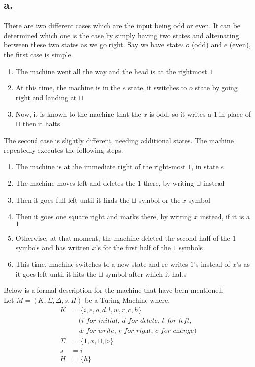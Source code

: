 \documentclass[12pt]{article}
\begin{document}
\subsection*{a.}
There are two different cases which are the input being odd or even. It can be determined which one is the case by simply having two states and alternating between these two states as we go right. Say we have states $o$ (odd) and $e$ (even), the first case is simple.
\begin{enumerate}
    \item The machine went all the way and the head is at the rightmost $1$
    \item At this time, the machine is in the $e$ state, it switches to $o$ state by going right and landing at $\sqcup$
    \item Now, it is known to the machine that the $x$ is odd, so it writes a $1$ in place of $\sqcup$ then it halts
\end{enumerate}
The second case is slightly different, needing additional states. The machine repeatedly executes the following steps.
\begin{enumerate}
    \item The machine is at the immediate right of the right-most $1$, in state $e$
    \item The machine moves left and deletes the $1$ there, by writing $\sqcup$ instead
    \item Then it goes full left until it finds the $\sqcup$ symbol or the $x$ symbol
    \item Then it goes one square right and marks there, by writing $x$ instead, if it is a $1$
    \item Otherwise, at that moment, the machine deleted the second half of the $1$ symbols and has written $x$'s for the first half of the $1$ symbols
    \item This time, machine switches to a new state and re-writes $1$'s instead of $x$'s as it goes left until it hits the $\sqcup$ symbol after which it halts
\end{enumerate}
Below is a formal description for the machine that have been mentioned.\\
Let $M=(K,\Sigma,\Delta, s, H)$ be a Turing Machine where,
\begin{align*}
    K &= \{i,e,o,d,l,w,r,c,h\}\\
    &~~~~~\textit{(i for initial, d for delete, l for left,}\\
    &~~~~~\textit{w for write, r for right, c for change)}\\
    \Sigma &= \{1,x,\sqcup,\triangleright\}\\
    s &= i\\
    H &= \{h\}
\end{align*}
\end{document}
